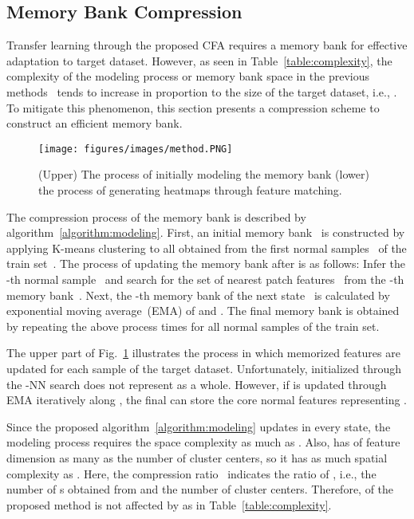 \documentclass[10pt,twocolumn,letterpaper]{article}
\begin{document}
    \subsection{Memory Bank Compression} \label{section:memory-bank}
        Transfer learning through the proposed CFA requires a memory bank for effective adaptation to target dataset. However, as seen in Table~\ref{table:complexity}, the complexity of the modeling process or memory bank space in the previous methods~\cite{SPADE,PaDiM,PatchCore} tends to increase in proportion to the size of the target dataset, i.e., . To mitigate this phenomenon, this section presents a compression scheme to construct an efficient memory bank.
        \begin{figure}[t!]
\begin{center}
    \texttt{[image: figures/images/method.PNG]}
\end{center}
\caption{(Upper) The process of initially modeling the memory bank (lower) the process of generating heatmaps through feature matching.}\vspace{-0.15cm}
\label{fig:method}
\end{figure}

%
 
        The compression process of the memory bank is described by algorithm~\ref{algorithm:modeling}. First, an initial memory bank~ is constructed by applying K-means clustering to all  obtained from the first normal samples~ of the train set~. The process of updating the memory bank after  is as follows: Infer the -th normal sample~ and search for the set of nearest patch features~ from the -th memory bank~. Next, the -th memory bank of the next state~ is calculated by exponential moving average~(EMA) of  and . The final memory bank  is obtained by repeating the above process  times for all normal samples of the train set.
        
        The upper part of Fig.~\ref{fig:method} illustrates the process in which memorized features are updated for each sample of the target dataset. Unfortunately,  initialized through the -NN search does not represent  as a whole. However, if  is updated through EMA iteratively along , the final  can store the core normal features representing .
        
        Since the proposed algorithm~\ref{algorithm:modeling} updates  in every state, the modeling process requires the space complexity as much as . Also,  has  of feature dimension  as many as the number of cluster centers, so it has as much spatial complexity as . Here, the compression ratio~ indicates the ratio of , i.e., the number of s obtained from  and the number of cluster centers. Therefore,  of the proposed method is not affected by  as in Table~\ref{table:complexity}.
        
\end{document}
